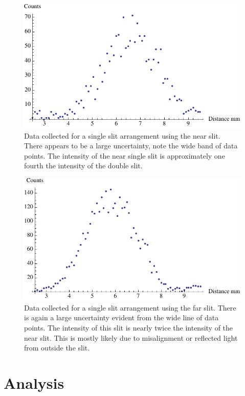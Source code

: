 \documentclass[prb,preprint]{revtex4-1}
\begin{document}
\begin{figure}[h!]
\centering
\includegraphics[width=6in]{singlenear.pdf}
\caption{Data collected for a single slit arrangement using the near slit. There appears to be a large uncertainty, note the wide band of data points. The intensity of the near single slit is approximately one fourth the intensity of the double slit.}
\label{singlenear}
\end{figure}

\begin{figure}[h!]
\centering
\includegraphics[width=6in]{singlefar.pdf}
\caption{Data collected for a single slit arrangement using the far slit. There is again a large uncertainty evident from the wide line of data points. The intensity of this slit is nearly twice the intensity of the near slit. This is mostly likely due to misalignment or reflected light from outside the slit.}
\label{singlefar}
\end{figure}


\section{Analysis}
\end{document}

